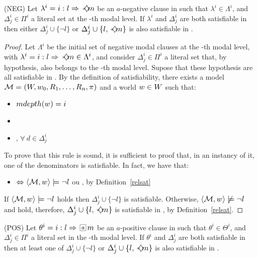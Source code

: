 \begin{lemma}{(NEG)} Let $\lambda^i = \cneg$ be an $a$-negative clause in 
    such that $\lambda^i \in \Lambda^i$, and $\Delta^i_j \in \Pi^i$ a literal
    set at the \ml-th modal level. If $\lambda^i$ and $\Delta^i_j$ are both
    satisfiable in  then either $\Delta^i_j \cup
    \{\neg l\}$ or $\Delta^i_j \cup \{l, \pos{a}m\}$ is also satisfiable in
    .
\end{lemma}
\begin{proof}
   Let $\Lambda^i$ be the initial set of negative modal clauses at the \ml-th
   modal level, with $\lambda^i = \cneg \in \Lambda^i$, and consider $\Delta^i_j
   \in \Pi^i$ a literal set that, by hypothesis, also belongs to the \ml-th
   modal level. Supose that these hypothesis are all satisfiable in
   . By the definition of satisfiability, there exists a
   model $\Model = (W, \st_0, R_1, \ldots, R_n, \pi)$ and a world $\st \in W$
   such that:
   \begin{itemize}
       \item $mdepth(w) = \ml$ 
       \item {}
       \item {}, $\forall~d \in \Delta^i_j$
   \end{itemize}
   To prove that this rule is sound, it is sufficient to proof that, in an
   instancy of it, one of the denominators is satisfiable. In fact, we have
   that:
   \begin{itemize}
       \item {} $\iff \sat{\Model}{\st}{\neg
           l}$ ou , by Definition~\ref{relsat}
   \end{itemize}
   If $\sat{\Model}{\st}{\neg l}$ holds then $\Delta^i_j \cup \{\neg l\}$ is
   satisfiable. Otherwise, $\langle \Model, \st \rangle \not \models \neg l$ and
    hold, therefore, $\Delta^i_j \cup \{l, \pos{a}
   m\}$ is satisfiable in , by Definition~\ref{relsat}. 
\end{proof}

\begin{lemma}{(POS)} Let $\theta^i = \cpos$ be an $a$-positive clause in 
    such that $\theta^i \in \Theta^i$, and $\Delta^i_j \in \Pi^i$ a literal
    set in the \ml-th modal level. If $\theta^i$ and $\Delta^i_j$ are both
    satisfiable in  then at least one of $\Delta^i_j \cup
    \{\neg l\}$ or $\Delta^i_j \cup \{l, \pos{a}m\}$ is also satisfiable in
    .
\end{lemma}

